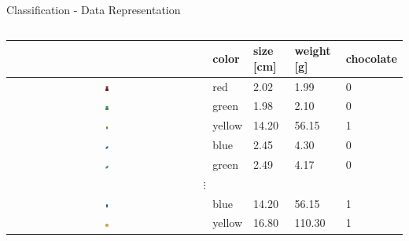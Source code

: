 \documentclass[aspectratio=169]{beamer}
\begin{document}
\begin{frame}{Classification - Data Representation}
    \scriptsize
    \begin{columns}
        \begin{column}{0.8\textwidth}
            \centering
            \begin{tabularx}{0.8\textwidth}{@{}c|Y|Y|Y|Y@{}}
                \toprule
                    & \textbf{color} & \textbf{size [cm]} & \textbf{weight [g]} & \textbf{chocolate}  \\
                \midrule
                \parbox[c]{1em}{\includegraphics[width=0.0175\textwidth]{Figures/023-gummy-bear-0.pdf}} & red & 2.02 & 1.99 & 0   \\
                \midrule
                 \parbox[c]{1em}{\includegraphics[width=0.0175\textwidth]{Figures/023-gummy-bear-1.pdf}} & green & 1.98  & 2.10 & 0   \\
                \midrule
                \parbox[c]{1em}{\includegraphics[width=0.0175\textwidth]{Figures/028-ice-cream-2.pdf}} & yellow & 14.20  & 56.15 & 1  \\
                \midrule
                \parbox[c]{1em}{\includegraphics[width=0.0175\textwidth]{Figures/041-candy-3.pdf}} & blue & 2.45  & 4.30 & 0   \\
                \midrule
                \parbox[c]{1em}{\includegraphics[width=0.0175\textwidth]{Figures/041-candy-1.pdf}} & green & 2.49  & 4.17 & 0  \\
                \midrule
                  \\
                \midrule
                \parbox[c]{1em}{\includegraphics[width=0.0175\textwidth]{Figures/028-ice-cream-3.pdf}} & blue & 14.20  & 56.15 & 1 \\
                \midrule
                \parbox[c]{1em}{\includegraphics[width=0.0175\textwidth]{Figures/046-donuts-2.pdf}} & yellow & 16.80  & 110.30 & 1  \\

\end{tabularx}
\end{column}
\end{columns}
\end{frame}
\end{document}
